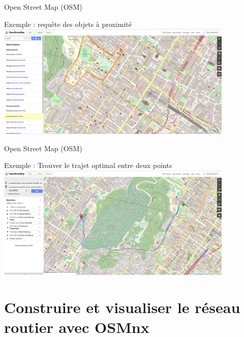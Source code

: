 \documentclass[aspectratio=169]{beamer}
\begin{document}
\begin{frame}{Open Street Map (OSM) \cite{haklay2008openstreetmap}}

{\Large Exemple : requête des objets à proximité}
\centering
\includegraphics[width=0.85\textwidth]{figures/osm_query}

\end{frame}

\begin{frame}{Open Street Map (OSM) \cite{haklay2008openstreetmap}}

{\Large Exemple : Trouver le trajet optimal entre deux points}
\centering
\includegraphics[width=0.85\textwidth]{figures/osm_routing}

\end{frame}


\section{Construire et visualiser le réseau routier avec OSMnx}
\end{document}
